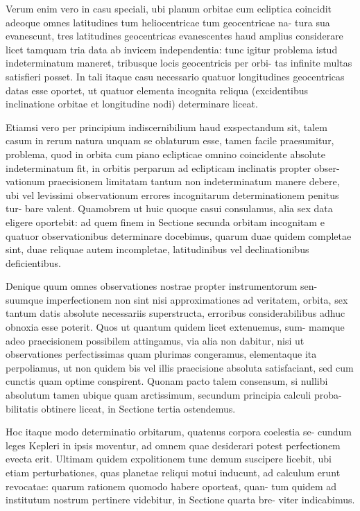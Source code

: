 \documentclass[12pt,a4paper]{article}
\begin{document}
Verum enim vero in casu speciali, ubi planum orbitae cum ecliptica
coincidit adeoque omnes latitudines tum heliocentricae tum geocentricae na-
tura sua evanescunt, tres latitudines geocentricas evanescentes haud amplius
considerare licet tamquam tria data ab invicem independentia: tunc igitur
problema istud indeterminatum maneret, tribusque locis geocentricis per orbi-
tas infinite multas satisfieri posset. In tali itaque casu necessario quatuor
longitudines geocentricas datas esse oportet, ut quatuor elementa incognita
reliqua (excidentibus inclinatione orbitae et longitudine nodi) determinare liceat.

Etiamsi vero per principium indiscernibilium haud exspectandum sit, talem
casum in rerum natura unquam se oblaturum esse, tamen facile praesumitur,
problema, quod in orbita cum piano eclipticae omnino coincidente absolute
indeterminatum fit, in orbitis perparum ad eclipticam inclinatis propter obser-
vationum praecisionem limitatam tantum non indeterminatum manere debere, ubi
vel levissimi observationum errores incognitarum determinationem penitus tur-
bare valent. Quamobrem ut huic quoque casui consulamus, alia sex data
eligere oportebit: ad quem finem in Sectione secunda orbitam incognitam e
quatuor observationibus determinare docebimus, quarum duae quidem completae
sint, duae reliquae autem incompletae, latitudinibus vel declinationibus deficientibus.

Denique quum omnes observationes nostrae propter instrumentorum sen-
suumque imperfectionem non sint nisi approximationes ad veritatem, orbita,
sex tantum datis absolute necessariis superstructa, erroribus considerabilibus
adhuc obnoxia esse poterit. Quos ut quantum quidem licet extenuemus, sum-
mamque adeo praecisionem possibilem attingamus, via alia non dabitur, nisi
ut observationes perfectissimas quam plurimas congeramus, elementaque ita
perpoliamus, ut non quidem bis vel illis praecisione absoluta satisfaciant, sed cum
cunctis quam optime conspirent. Quonam pacto talem consensum, si nullibi
absolutum tamen ubique quam arctissimum, secundum principia calculi proba-
bilitatis obtinere liceat, in Sectione tertia ostendemus.

Hoc itaque modo determinatio orbitarum, quatenus corpora coelestia se-
cundum leges Kepleri in ipsis moventur, ad omnem quae desiderari potest
perfectionem evecta erit. Ultimam quidem expolitionem tunc demum suscipere
licebit, ubi etiam perturbationes, quas planetae reliqui motui inducunt, ad
calculum erunt revocatae: quarum rationem quomodo habere oporteat, quan-
tum quidem ad institutum nostrum pertinere videbitur, in Sectione quarta bre-
viter indicabimus.
\end{document}
